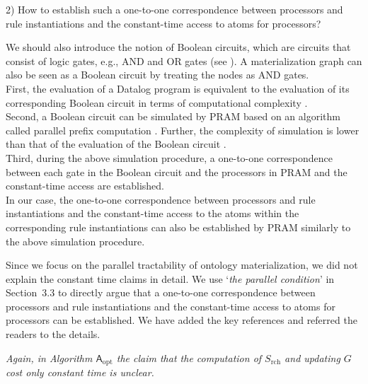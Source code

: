 \documentclass{article}
\let\quoteOld\quote
\let\endquoteOld\endquote
\renewenvironment{quote}{\quoteOld\itshape}{\endquoteOld}
\begin{document}
2) How to establish such a one-to-one correspondence between processors
and rule instantiations and the constant-time access to atoms for processors?

We should also introduce the notion of Boolean circuits, which are
circuits that consist of logic gates, e.g., AND and OR gates (see
\cite[Section~2.3]{Raymond95}).  A materialization graph can also be
seen as a Boolean circuit by treating the nodes as AND gates.\\
%
First, the evaluation of a Datalog program is equivalent to the evaluation
of its corresponding Boolean circuit in terms of computational
complexity \cite{DMRT14a}. \\
%
Second, a Boolean circuit can be simulated by PRAM based on an
algorithm called parallel prefix computation \cite{LaFi80a}.  Further,
the complexity of simulation is lower than that of the evaluation of
the Boolean circuit \cite[Lemma~2.4.1]{Raymond95}.\\
%
Third, during the above simulation procedure, a one-to-one
correspondence between each gate in the Boolean circuit and the
processors in PRAM and the constant-time access are established.\\
%
In our case, the one-to-one correspondence between processors and rule
instantiations and the constant-time access to the atoms within the corresponding
rule instantiations can also be
established by PRAM similarly to the above simulation procedure.

Since we focus on the parallel tractability of ontology materialization,
we did not explain the constant time claims in detail.
We use `\emph{the parallel condition}' in Section~3.3 to directly
argue that a one-to-one correspondence between processors
and rule instantiations and the constant-time access to atoms for processors
can be established. We have added the key references and referred the readers
to the details.

\begin{quote}
  Again, in Algorithm $\mathsf{A}_\text{opt}$ the claim that the
  computation of $S_\text{rch}$ and updating $G$ cost only constant
  time is unclear.
\end{quote}
\end{document}
